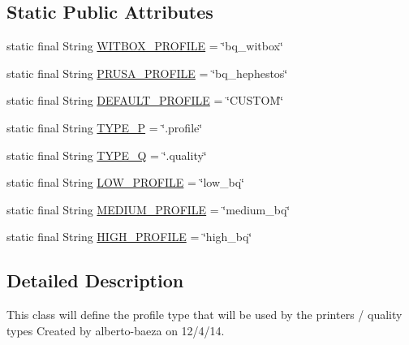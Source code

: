 \subsection*{Static Public Attributes}
\begin{DoxyCompactItemize}
\item 
static final String \hyperlink{classandroid_1_1app_1_1printerapp_1_1model_1_1_model_profile_ae723c547d1041b6bb11f585c7af60dac}{W\+I\+T\+B\+O\+X\+\_\+\+P\+R\+O\+F\+I\+LE} = \char`\"{}bq\+\_\+witbox\char`\"{}
\item 
static final String \hyperlink{classandroid_1_1app_1_1printerapp_1_1model_1_1_model_profile_a8bbb204a0d35279c741908bc21930e9d}{P\+R\+U\+S\+A\+\_\+\+P\+R\+O\+F\+I\+LE} = \char`\"{}bq\+\_\+hephestos\char`\"{}
\item 
static final String \hyperlink{classandroid_1_1app_1_1printerapp_1_1model_1_1_model_profile_a9c466408e0e2afde8310554122d08ca2}{D\+E\+F\+A\+U\+L\+T\+\_\+\+P\+R\+O\+F\+I\+LE} = \char`\"{}C\+U\+S\+T\+OM\char`\"{}
\item 
static final String \hyperlink{classandroid_1_1app_1_1printerapp_1_1model_1_1_model_profile_a852218158cd69bbc25dbbed103c1da28}{T\+Y\+P\+E\+\_\+P} = \char`\"{}.profile\char`\"{}
\item 
static final String \hyperlink{classandroid_1_1app_1_1printerapp_1_1model_1_1_model_profile_afbd41c9994cd4414d4d5a227c6e97e6d}{T\+Y\+P\+E\+\_\+Q} = \char`\"{}.quality\char`\"{}
\item 
static final String \hyperlink{classandroid_1_1app_1_1printerapp_1_1model_1_1_model_profile_a836448e1354dfc498f5f707aa251dc82}{L\+O\+W\+\_\+\+P\+R\+O\+F\+I\+LE} = \char`\"{}low\+\_\+bq\char`\"{}
\item 
static final String \hyperlink{classandroid_1_1app_1_1printerapp_1_1model_1_1_model_profile_a15c62d58a86bdff26b58998f965d2df3}{M\+E\+D\+I\+U\+M\+\_\+\+P\+R\+O\+F\+I\+LE} = \char`\"{}medium\+\_\+bq\char`\"{}
\item 
static final String \hyperlink{classandroid_1_1app_1_1printerapp_1_1model_1_1_model_profile_a1fbf76e9850481af16033e2756a25abf}{H\+I\+G\+H\+\_\+\+P\+R\+O\+F\+I\+LE} = \char`\"{}high\+\_\+bq\char`\"{}
\end{DoxyCompactItemize}


\subsection{Detailed Description}
This class will define the profile type that will be used by the printers / quality types Created by alberto-\/baeza on 12/4/14. 


